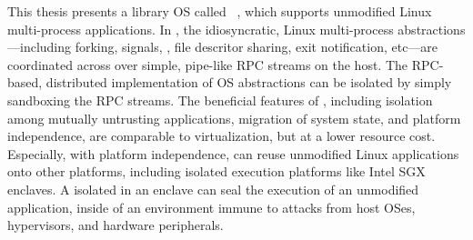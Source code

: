 This thesis presents a library OS called \graphene{}~\cite{tsai14graphene},
which supports unmodified Linux multi-process applications.
In \graphene{},
the idiosyncratic, Linux multi-process abstractions---including forking, signals, \sysvipc{}, file descritor sharing, exit notification, etc---are coordinated
across \picoprocs{}
over simple, pipe-like RPC streams on the host.
The RPC-based, distributed implementation of OS abstractions
can be isolated by simply sandboxing the RPC streams.
The beneficial features of \graphene{}, %
including isolation among mutually untrusting applications,
migration of system state,
and platform independence,
are comparable to virtualization,
but at a lower resource cost.
Especially, with platform independence, \graphene{}
can reuse unmodified Linux applications
onto other platforms,
including isolated execution platforms like Intel SGX enclaves.
A \graphene{} \picoproc{} isolated in an enclave
can seal the execution of an unmodified application,
inside of an environment immune to attacks from host OSes, hypervisors,
and hardware peripherals.




